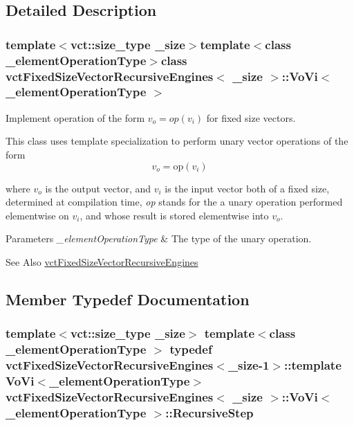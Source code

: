 \subsection{Detailed Description}
\subsubsection*{template$<$vct\-::size\-\_\-type \-\_\-size$>$template$<$class \-\_\-element\-Operation\-Type$>$class vct\-Fixed\-Size\-Vector\-Recursive\-Engines$<$ \-\_\-size $>$\-::\-Vo\-Vi$<$ \-\_\-element\-Operation\-Type $>$}

Implement operation of the form $v_o = op(v_i)$ for fixed size vectors. 

This class uses template specialization to perform unary vector operations of the form \[ v_{o} = \mathrm{op}(v_{i}) \]

where $v_{o}$ is the output vector, and $v_{i}$ is the input vector both of a fixed size, determined at compilation time, {\itshape op} stands for the a unary operation performed elementwise on $v_{i}$, and whose result is stored elementwise into $v_{o}$.


\begin{DoxyParams}{Parameters}
{\em \-\_\-element\-Operation\-Type} & The type of the unary operation.\\
\hline
\end{DoxyParams}
\begin{DoxySeeAlso}{See Also}
\hyperlink{classvct_fixed_size_vector_recursive_engines}{vct\-Fixed\-Size\-Vector\-Recursive\-Engines} 
\end{DoxySeeAlso}


\subsection{Member Typedef Documentation}
\hypertarget{classvct_fixed_size_vector_recursive_engines_1_1_vo_vi_ac104b8d2ed9b8652bc03c1bfd9908ff1}{
\subsubsection[{Recursive\-Step}]{\setlength{\rightskip}{0pt plus 5cm}template$<$vct\-::size\-\_\-type \-\_\-size$>$ template$<$class \-\_\-element\-Operation\-Type $>$ typedef {\bf vct\-Fixed\-Size\-Vector\-Recursive\-Engines}$<$\-\_\-size-\/1$>$\-::template {\bf Vo\-Vi}$<$\-\_\-element\-Operation\-Type$>$ {\bf vct\-Fixed\-Size\-Vector\-Recursive\-Engines}$<$ \-\_\-size $>$\-::{\bf Vo\-Vi}$<$ \-\_\-element\-Operation\-Type $>$\-::{\bf Recursive\-Step}}}\label{classvct_fixed_size_vector_recursive_engines_1_1_vo_vi_ac104b8d2ed9b8652bc03c1bfd9908ff1}


